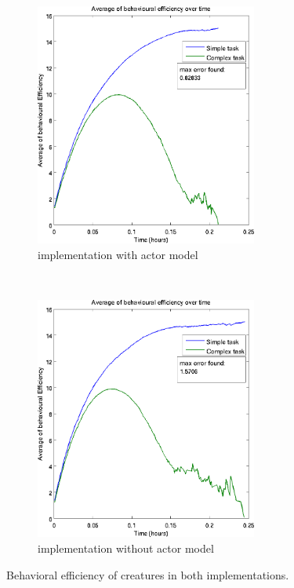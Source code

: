 \documentclass[runningheads]{llncs}
\begin{document}
\begin{figure}[h]
	\centering
	\begin{subfigure}[t]{1\textwidth}
		\centering
		\includegraphics[height=8cm]{images/efficienceAkka}
		\caption{implementation with actor model}
		\label{fig:behaviorWithAkka}
	\end{subfigure}%
\\ 
	\begin{subfigure}[t]{1\textwidth}
		\centering
		\includegraphics[height=8cm]{images/efficienceNoAkka}
		\caption{implementation without actor model}
		\label{fig:behaviorWithout}
	\end{subfigure}
	\caption{Behavioral efficiency of creatures in both implementations. }
	\label{behavior}
\end{figure}

\newpage
\end{document}
